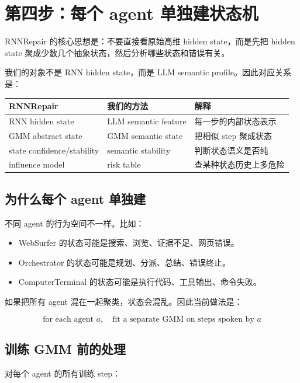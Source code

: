 \documentclass[UTF8,a4paper,11pt]{ctexart}
\begin{document}
\section{第四步：每个 agent 单独建状态机}

RNNRepair 的核心思想是：不要直接看原始高维 hidden state，而是先把 hidden state 聚成少数几个抽象状态，然后分析哪些状态和错误有关。

我们的对象不是 RNN hidden state，而是 LLM semantic profile。因此对应关系是：

\begin{table}[htbp]
\centering
\begin{tabular}{lll}
\toprule
RNNRepair & 我们的方法 & 解释 \\
\midrule
RNN hidden state & LLM semantic feature & 每一步的内部状态表示 \\
GMM abstract state & GMM semantic state & 把相似 step 聚成状态 \\
state confidence/stability & semantic stability & 判断状态语义是否纯 \\
influence model & risk table & 查某种状态历史上多危险 \\
\bottomrule
\end{tabular}
\end{table}

\subsection{为什么每个 agent 单独建}

不同 agent 的行为空间不一样。比如：

\begin{itemize}
  \item WebSurfer 的状态可能是搜索、浏览、证据不足、网页错误。
  \item Orchestrator 的状态可能是规划、分派、总结、错误终止。
  \item ComputerTerminal 的状态可能是执行代码、工具输出、命令失败。
\end{itemize}

如果把所有 agent 混在一起聚类，状态会混乱。因此当前做法是：

\[
\text{for each agent } a,\quad \text{fit a separate GMM on steps spoken by } a
\]

\subsection{训练 GMM 前的处理}

对每个 agent 的所有训练 step：
\end{document}
